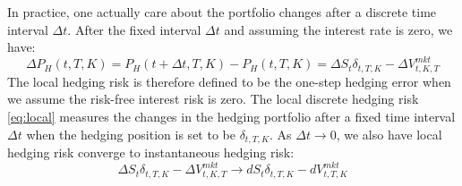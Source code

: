 \documentclass[letterpaper,12pt,titlepage,oneside,final]{book}
\numberwithin{equation}{section}
\theoremstyle{definition}
\newcommand{\DT}{\Delta t}
\newcommand{\Vmkt}{V^{mkt}}
\newcommand{\Smkt}{S}
\begin{document}
In practice, one actually care about the portfolio changes after a discrete time interval $\DT$.
After the fixed interval $\DT$  and assuming the interest rate is zero,
we have:
\begin{equation}
	\label{eq:localPL}
    \Delta P_{H}(t,T,K)=P_{H}(t+\DT,T,K)-P_{H}(t,T,K)=\Delta \Smkt_{t}\delta_{t,T,K} -\Delta V^{mkt}_{t,K,T}
\end{equation}
The local hedging risk is therefore defined to be the one-step hedging error when we assume the risk-free interest risk is zero. The local discrete hedging risk \eqref{eq:local} measures  the changes in the hedging portfolio after a fixed time interval $\DT$ when the hedging position is set to be $\delta_{t,T,K}$.  
 As $\DT \rightarrow 0$, we also have local hedging risk converge to instantaneous hedging risk: 
\[
\Delta \Smkt_{t}\delta_{t,T,K} -\Delta V^{mkt}_{t,K,T}  \rightarrow d\Smkt_{t}\delta_{t,T,K}-d \Vmkt_{t,T,K}
\]
\end{document}
